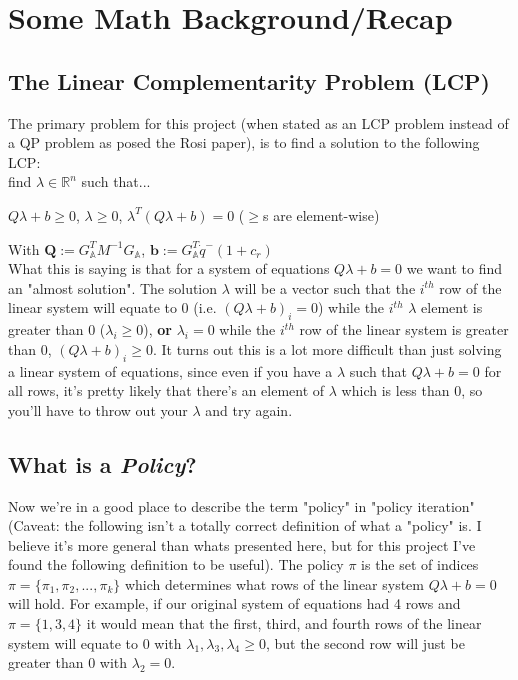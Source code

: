 \documentclass[12pt]{article}
\newcommand{\GA}{G_{\mathbb{A}}}
\begin{document}
\section{Some Math Background/Recap}

\subsection{The Linear Complementarity Problem (LCP)}

The primary problem for this project
(when stated as an LCP problem instead of a QP problem as posed the Rosi paper),
is to find a solution to the following LCP:
\\

find $\lambda \in \mathbb{R}^n$ such that...

$Q\lambda + b \geq 0$, $\lambda \geq 0$, $\lambda^T (Q\lambda + b) = 0$ ($\geq$s are element-wise)

With
$\mathbf{Q} := \GA^T M^{-1} \GA$,
$\mathbf{b} := \GA^T \dot{q}^- (1 + c_r)$
\\

What this is saying is that for a system of equations $Q \lambda + b = 0$ we want to find an "almost solution".
The solution $\lambda$ will be a vector such that the $i^{th}$ row of the linear system
will equate to 0 (i.e. $(Q \lambda + b)_i = 0$) while the $i^{th}$ $\lambda$ element is greater than 0 ($\lambda_i \geq 0$),
\textbf{or} $\lambda_i = 0$ while the $i^{th}$ row of the linear system is greater than 0, $(Q \lambda + b)_i \geq 0$.
It turns out this is a lot more difficult than just solving a linear system of equations,
since even if you have a $\lambda$ such that $Q \lambda + b = 0$ for all rows,
it's pretty likely that there's an element of $\lambda$ which is less than 0,
so you'll have to throw out your $\lambda$ and try again.

\subsection{What is a \textit{Policy}?}

Now we're in a good place to describe the term "policy" in "policy iteration"
(Caveat: the following isn't a totally correct definition of what a "policy" is.
I believe it's more general than whats presented here, but for this project
I've found the following definition to be useful).
The policy $\pi$ is the set of indices $\pi = \{\pi_1, \pi_2, ..., \pi_k \}$
which determines what rows of the linear system $Q \lambda + b = 0$ will hold.
For example, if our original system of equations had 4 rows and $\pi  = \{1, 3, 4\}$
it would mean that the first, third, and fourth rows of the linear system will equate to 0
with $\lambda_1, \lambda_3, \lambda_4 \geq 0$,
but the second row will just be greater than 0 with $\lambda_2 = 0$.
\end{document}
